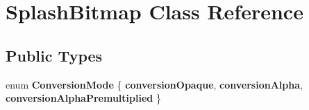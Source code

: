 \hypertarget{class_splash_bitmap}{}\section{Splash\+Bitmap Class Reference}
\label{class_splash_bitmap}
\subsection*{Public Types}
\begin{DoxyCompactItemize}
\item 
\mbox{\label{class_splash_bitmap_a01ef4a41c88a74f74daa1500e4e82680}} 
enum {\bfseries Conversion\+Mode} \{ {\bfseries conversion\+Opaque}, 
{\bfseries conversion\+Alpha}, 
{\bfseries conversion\+Alpha\+Premultiplied}
 \}
\end{DoxyCompactItemize}
